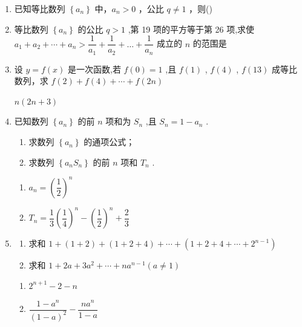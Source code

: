 \begin{enumerate}
    \item 已知等比数列 $\left\{a_n\right\}$ 中，$a_n>0$ ，公比 $q \neq 1$ ，则\dotfill{}()

    \item 等比数列 $\left\{  {a}_{n}\right\}$ 的公比 $q > 1$ ,第 19 项的平方等于第 26 项,求使${a}_{1} + {a}_{2} + \cdots  + {a}_{n} > \dfrac{1}{{a}_{1}} + \dfrac{1}{{a}_{2}} + \ldots  + \dfrac{1}{{a}_{n}}$ 成立的 $n$ 的范围是      


    \item 设 $y = f\left( x\right)$ 是一次函数,若 $f\left( 0\right)  = 1$ ,且 $f\left( 1\right)$ , $f\left( 4\right)$ , $f\left( {13}\right)$ 成等比数列，求 $f\left( 2\right)  + f\left( 4\right)  + \cdots  + f\left( {2n}\right)$
    \begin{jieda}
        $n(2n+3)$
    \end{jieda}
    
    \item 已知数列 $\left\{  {a}_{n}\right\}$ 的前 $n$ 项和为 ${S}_{n}$ ,且 ${S}_{n} = 1 - {a}_{n}$ .
    \begin{enumerate}
        \item 求数列 $\left\{  {a}_{n}\right\}$ 的通项公式；
        \item 求数列 $\left\{  {{a}_{n}{S}_{n}}\right\}$ 的前 $n$ 项和 ${T}_{n}$ .
    \end{enumerate}
    \begin{jieda}
        \begin{enumerate}
            \item $a_n = \left(\dfrac{1}{2}\right)^n$
            \item $T_n = \dfrac{1}{3}\left(\dfrac{1}{4}\right)^n-\left(\dfrac{1}{2}\right)^n+\dfrac{2}{3}$
        \end{enumerate}
    \end{jieda}

    \item 
    \begin{enumerate}
        \item 求和 $1 + \left( {1 + 2}\right)  + \left( {1 + 2 + 4}\right)  + \cdots  + \left( {1 + 2 + 4 + \cdots  + {2}^{n - 1}}\right)$
        \item 求和 $1 + {2a} + 3{a}^{2} + \cdots  + n{a}^{n - 1}\left( {a \neq  1}\right)$
    \end{enumerate}
    \begin{jieda}
        \begin{enumerate}
            \item $2^{n+1}-2-n$
            \item $\dfrac{1-a^n}{(1-a)^2} - \dfrac{na^n}{1-a}$
        \end{enumerate}
    \end{jieda}
    

\end{enumerate}
